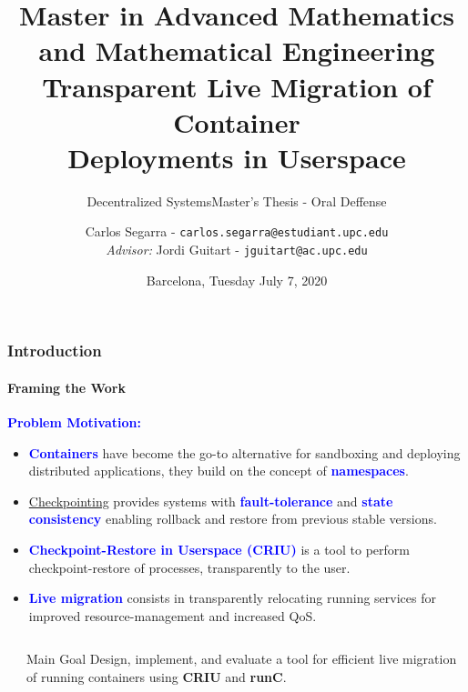 \documentclass[9pt,    %
    english,            %
    xcolor=table,       %
    envcountsect,        %
    aspectratio=169     %
]{beamer}
\subtitle{Decentralized Systems} %
\title[C/R of Established TCP Connections] %
    {\normalsize Master in Advanced Mathematics and Mathematical Engineering \\[5pt] \Large Transparent Live Migration of Container \\ \Large Deployments in Userspace}
\subtitle{Master's Thesis - Oral Deffense} %
\date[July 7, 2020] %
    {Barcelona, Tuesday July 7, 2020}
\author[] %
{Carlos Segarra - \texttt{carlos.segarra@estudiant.upc.edu} \\ \textit{Advisor:} Jordi Guitart - \texttt{jguitart@ac.upc.edu}}
\begin{document}

\begin{frame}
  \titlepage
\end{frame}

\begin{frame}
    \frametitle{Introduction}
    \framesubtitle{Framing the Work}

    \textbf{\textcolor{blue}{Problem Motivation:}}
    \begin{itemize}
        \item \textbf{\textcolor{blue}{Containers}} have become the go-to alternative for sandboxing and deploying distributed applications, they build on the concept of \textbf{\textcolor{blue}{namespaces}}.
        \item \href{https://en.wikipedia.org/wiki/Application_checkpointing}{Checkpointing} provides systems with \textbf{\textcolor{blue}{fault-tolerance}} and \textbf{\textcolor{blue}{state consistency}} enabling rollback and restore from previous stable versions.
        \item \textbf{\textcolor{blue}{Checkpoint-Restore in Userspace (CRIU)}} is a tool to perform checkpoint-restore of processes, transparently to the user.
        \item \textbf{\textcolor{blue}{Live migration}} consists in transparently relocating running services for improved resource-management and increased QoS.
    \end{itemize}

    \begin{columns}
        \begin{column}{.1\textwidth}
        \end{column}\hspace{-5cm}
        \begin{column}{.7\textwidth}
            \begin{alertblock}{Main Goal}
                Design, implement, and evaluate a tool for efficient live migration of running containers using \textbf{CRIU} and \textbf{runC}.
            \end{alertblock}\hfill
        \end{column}
    \end{columns}

\end{frame}
\end{document}
